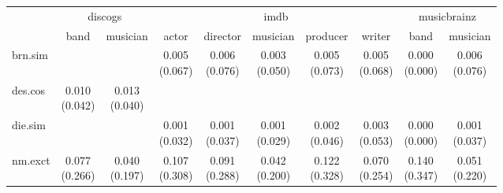 \documentclass[epsfig,a4paper,11pt,titlepage,twoside,openany]{book}
\begin{document}
\begin{table}[h]
\centering
\begin{tabular}{l|c|c|c|c|c|c|c|c|c|}
\cline{2-10}
                                                           & \multicolumn{2}{c|}{discogs} & \multicolumn{5}{c|}{imdb}                                                & \multicolumn{2}{c|}{musicbrainz} \\ \cline{2-10} 
                                                           & band          & musician     & actor        & director     & musician     & producer     & writer       & band            & musician       \\ \hline
\multicolumn{1}{|l|}{brn.sim}                        &               &              & \makecell{0.005 \\ (0.067)} & \makecell{0.006 \\ (0.076)} & \makecell{0.003 \\ (0.050)} & \makecell{0.005 \\ (0.073)} & \makecell{0.005 \\ (0.068)} & \makecell{0.000 \\ (0.000)}    & \makecell{0.006 \\ (0.076)}   \\ \hline
\multicolumn{1}{|l|}{des.cos}                  & \makecell{0.010 \\ (0.042)}  & \makecell{0.013 \\ (0.040)} &              &              &              &              &              &                 &                \\ \hline
\multicolumn{1}{|l|}{die.sim}                        &               &              & \makecell{0.001 \\ (0.032)} & \makecell{0.001 \\ (0.037)} & \makecell{0.001 \\ (0.029)} & \makecell{0.002 \\ (0.046)} & \makecell{0.003 \\ (0.053)} & \makecell{0.000 \\ (0.000)}    & \makecell{0.001 \\ (0.037)}   \\ \hline
\multicolumn{1}{|l|}{nm.exct}                          & \makecell{0.077 \\ (0.266)}  & \makecell{0.040 \\ (0.197)} & \makecell{0.107 \\ (0.308)} & \makecell{0.091 \\ (0.288)} & \makecell{0.042 \\ (0.200)} & \makecell{0.122 \\ (0.328)} & \makecell{0.070 \\ (0.254)} & \makecell{0.140 \\ (0.347)}    & \makecell{0.051 \\ (0.220)}   \\ \hline

\end{tabular}
\end{table}
\end{document}
